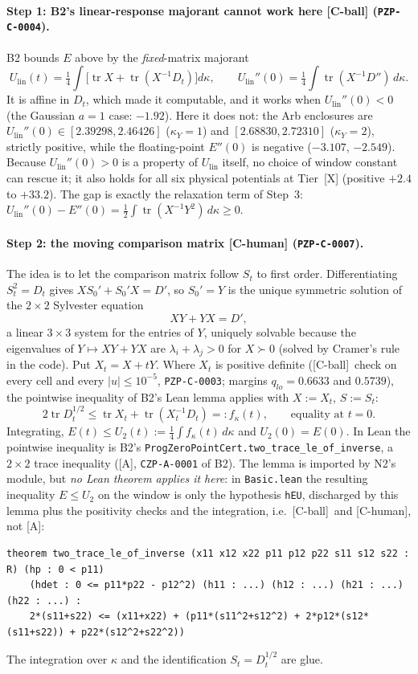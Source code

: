 \documentclass[10pt]{article}
\newcommand{\tier}[1]{\textsf{[#1]}}
\newcommand{\tA}{\tier{A}}
\newcommand{\tX}{\tier{X}}
\newcommand{\tCh}{\tier{C-human}}
\newcommand{\tCb}{\textcolor{blue!60!black}{\textsf{[C-ball]}}}
\newcommand{\lean}[1]{\texttt{#1}}
\newcommand{\tr}{\operatorname{tr}}
\newcommand{\Ulin}{U_{\mathrm{lin}}}
\begin{document}
\paragraph{Step 1: B2's linear-response majorant cannot work here \tCb{} (\texttt{PZP-C-0004}).} B2 bounds $E$ above by the \emph{fixed}-matrix majorant
\[\Ulin(t)=\tfrac14\int\bigl[\tr X+\tr(X^{-1}D_t)\bigr]d\kappa,\qquad \Ulin''(0)=\tfrac14\int\tr(X^{-1}D'')\,d\kappa .\]
It is affine in $D_t$, which made it computable, and it works when $\Ulin''(0)<0$ (the Gaussian $a=1$ case: $-1.92$). Here it does not: the Arb enclosures are $\Ulin''(0)\in[2.39298,2.46426]$ ($\kappa_Y=1$) and $[2.68830,2.72310]$ ($\kappa_Y=2$), strictly positive, while the floating-point $E''(0)$ is negative ($-3.107$, $-2.549$). Because $\Ulin''(0)>0$ is a property of $\Ulin$ itself, no choice of window constant can rescue it; it also holds for all six physical potentials at Tier~\tX{} (positive $+2.4$ to $+33.2$). The gap is exactly the relaxation term of Step~3: $\Ulin''(0)-E''(0)=\tfrac12\int\tr(X^{-1}Y^2)\,d\kappa\ge0$.

\paragraph{Step 2: the moving comparison matrix \tCh{} (\texttt{PZP-C-0007}).} The idea is to let the comparison matrix follow $S_t$ to first order. Differentiating $S_t^2=D_t$ gives $XS_0'+S_0'X=D'$, so $S_0'=Y$ is the unique symmetric solution of the $2\times2$ Sylvester equation
\[XY+YX=D',\]
a linear $3\times3$ system for the entries of $Y$, uniquely solvable because the eigenvalues of $Y\mapsto XY+YX$ are $\lambda_i+\lambda_j>0$ for $X\succ0$ (solved by Cramer's rule in the code).
Put $X_t=X+tY$. Where $X_t$ is positive definite (\tCb\ check on every cell and every $|u|\le10^{-5}$, \texttt{PZP-C-0003}; margins $q_{lo}=0.6633$ and $0.5739$), the pointwise inequality of B2's Lean lemma applies with $X:=X_t$, $S:=S_t$:
\[2\tr D_t^{1/2}\le \tr X_t+\tr(X_t^{-1}D_t)=:f_\kappa(t),\qquad\text{equality at }t=0 .\]
Integrating, $E(t)\le U_2(t):=\tfrac14\int f_\kappa(t)\,d\kappa$ and $U_2(0)=E(0)$. In Lean the pointwise inequality is B2's \lean{ProgZeroPointCert.two\_trace\_le\_of\_inverse}, a $2\times2$ trace inequality (\tA, \texttt{CZP-A-0001} of B2). The lemma is imported by N2's module, but \emph{no Lean theorem applies it here}: in \texttt{Basic.lean} the resulting inequality $E\le U_2$ on the window is only the hypothesis \lean{hEU}, discharged by this lemma plus the positivity checks and the integration, i.e.\ \tCb\ and \tCh, not \tA:
\begin{lstlisting}
theorem two_trace_le_of_inverse (x11 x12 x22 p11 p12 p22 s11 s12 s22 : R) (hp : 0 < p11)
    (hdet : 0 <= p11*p22 - p12^2) (h11 : ...) (h12 : ...) (h21 : ...) (h22 : ...) :
    2*(s11+s22) <= (x11+x22) + (p11*(s11^2+s12^2) + 2*p12*(s12*(s11+s22)) + p22*(s12^2+s22^2))
\end{lstlisting}
The integration over $\kappa$ and the identification $S_t=D_t^{1/2}$ are glue.
\end{document}
